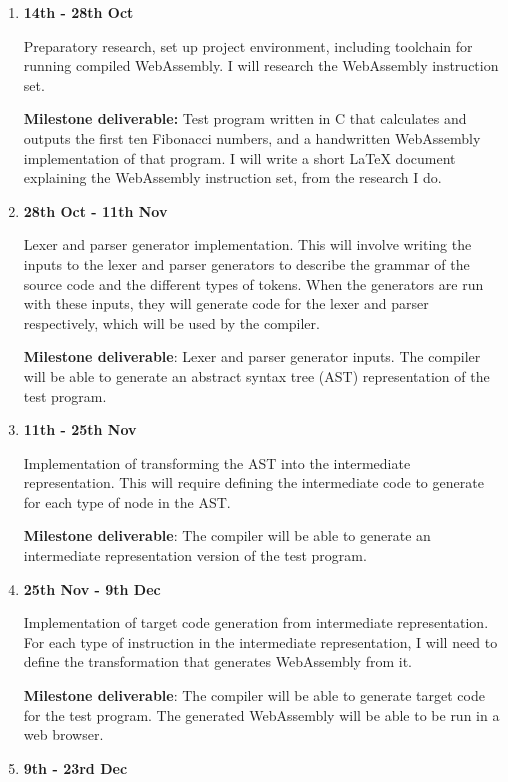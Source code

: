 \begin{enumerate}

\item \textbf{14th - 28th Oct}

  Preparatory research, set up project environment, including toolchain for running compiled WebAssembly. I will research the WebAssembly instruction set.

  \textbf{Milestone deliverable:} Test program written in C that calculates and outputs the first ten Fibonacci numbers, and a handwritten WebAssembly implementation of that program. I will write a short LaTeX document explaining the WebAssembly instruction set, from the research I do.

\item\textbf{28th Oct - 11th Nov}

  Lexer and parser generator implementation.
  This will involve writing the inputs to the lexer and parser generators to describe the grammar of the source code and the different types of tokens.
  When the generators are run with these inputs, they will generate code for the lexer and parser respectively, which will be used by the compiler.

  \textbf{Milestone deliverable}: Lexer and parser generator inputs. The compiler will be able to generate an abstract syntax tree (AST) representation of the test program.

\item\textbf{11th - 25th Nov}

  Implementation of transforming the AST into the intermediate representation.
  This will require defining the intermediate code to generate for each type of node in the AST.

  \textbf{Milestone deliverable}: The compiler will be able to generate an intermediate representation version of the test program.

\item\textbf{25th Nov - 9th Dec}

  Implementation of target code generation from intermediate representation.
  For each type of instruction in the intermediate representation, I will need to define the transformation that generates WebAssembly from it.

  \textbf{Milestone deliverable}: The compiler will be able to generate target code for the test program. The generated WebAssembly will be able to be run in a web browser.

\item\textbf{9th - 23rd Dec}


\end{enumerate}
